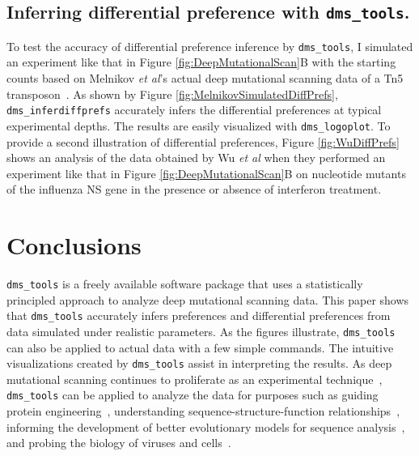 \documentclass[twocolumn]{bmcart}%
\begin{document}
\subsection*{Inferring differential preference with \texttt{dms\_tools}.}
To test the accuracy of differential preference inference by \texttt{dms\_tools}, I simulated an experiment like that in Figure \ref{fig:DeepMutationalScan}B with the starting counts based on Melnikov \textit{et al}'s actual deep mutational scanning data of a Tn5 transposon~\cite{melnikov2014comprehensive}. As shown by Figure \ref{fig:MelnikovSimulatedDiffPrefs}, \texttt{dms\_inferdiffprefs} accurately infers the differential preferences at typical experimental depths. The results are easily visualized with \texttt{dms\_logoplot}. To provide a second illustration of differential preferences, Figure \ref{fig:WuDiffPrefs} shows an analysis of the data obtained by Wu \textit{et al} when they performed an experiment like that in Figure \ref{fig:DeepMutationalScan}B on nucleotide mutants of the influenza NS gene in the presence or absence of interferon treatment.

\section*{Conclusions}
\texttt{dms\_tools} is a freely available software package that uses a statistically principled approach to analyze deep mutational scanning data. This paper shows that \texttt{dms\_tools} accurately infers preferences and differential preferences from data simulated under realistic parameters. As the figures illustrate, \texttt{dms\_tools} can also be applied to actual data with a few simple commands. The intuitive visualizations created by \texttt{dms\_tools} assist in interpreting the results. As deep mutational scanning continues to proliferate as an experimental technique~\cite{fowler2014deep}, \texttt{dms\_tools} can be applied to analyze the data for purposes such as guiding protein engineering~\cite{traxlmayr2012construction,melnikov2014comprehensive}, understanding sequence-structure-function relationships~\cite{mclaughlin2012spatial,starita2013activity,roscoe2013analyses,olson2014comprehensive,araya2012fundamental}, informing the development of better evolutionary models for sequence analysis~\cite{bloom2014experimentally,bloom2014informed}, and probing the biology of viruses and cells~\cite{melamed2013deep,firnberg2014comprehensive,thyagarajan2014inherent,wu2014high,wu2014ns,findlay2014saturation}.
\end{document}
